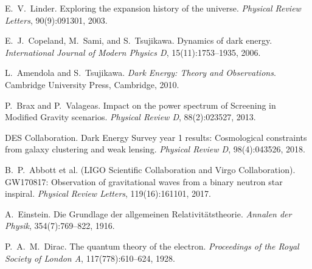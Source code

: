 \documentclass[11pt,a4paper]{article}
\numberwithin{equation}{section}
\theoremstyle{plain}
\theoremstyle{definition}
\theoremstyle{remark}
\begin{document}
\begin{thebibliography}{99}
E.~V.~Linder.
\newblock Exploring the expansion history of the universe.
\newblock \emph{Physical Review Letters}, 90(9):091301, 2003.

E.~J.~Copeland, M.~Sami, and S.~Tsujikawa.
\newblock Dynamics of dark energy.
\newblock \emph{International Journal of Modern Physics D}, 15(11):1753--1935, 2006.

L.~Amendola and S.~Tsujikawa.
\newblock \emph{Dark Energy: Theory and Observations}.
\newblock Cambridge University Press, Cambridge, 2010.

P.~Brax and P.~Valageas.
\newblock Impact on the power spectrum of Screening in Modified Gravity scenarios.
\newblock \emph{Physical Review D}, 88(2):023527, 2013.

DES Collaboration.
\newblock Dark Energy Survey year 1 results: Cosmological constraints from galaxy clustering and weak lensing.
\newblock \emph{Physical Review D}, 98(4):043526, 2018.

B.~P.~Abbott et al. (LIGO Scientific Collaboration and Virgo Collaboration).
\newblock GW170817: Observation of gravitational waves from a binary neutron star inspiral.
\newblock \emph{Physical Review Letters}, 119(16):161101, 2017.

A.~Einstein.
\newblock Die Grundlage der allgemeinen Relativitätstheorie.
\newblock \emph{Annalen der Physik}, 354(7):769--822, 1916.

P.~A.~M.~Dirac.
\newblock The quantum theory of the electron.
\newblock \emph{Proceedings of the Royal Society of London A}, 117(778):610--624, 1928.

\end{thebibliography}
\end{document}
